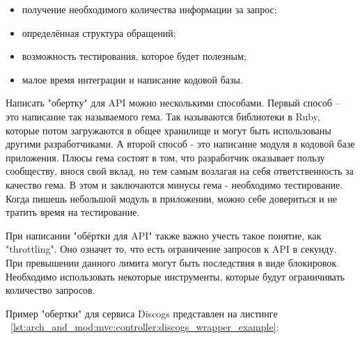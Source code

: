 \begin{itemize}
  \item получение необходимого количества информации за запрос;
  \item определённая структура обращений;
  \item возможность тестирования, которое будет полезным;
  \item малое время интеграции и написание кодовой базы.
\end{itemize}

Написать "обертку" для API можно несколькими способами. Первый способ -- это написание так называемого гема. Так называются библиотеки в Ruby, которые потом загружаются в общее хранилище и могут быть использованы другими разработчиками. А второй способ - это написание модуля в кодовой базе приложения. Плюсы гема состоят в том, что разработчик оказывает пользу сообществу, внося свой вклад, но тем самым возлагая на себя ответственность за качество гема. В этом и заключаются минусы гема - необходимо тестирование. Когда пишешь небольшой модуль в приложении, можно себе довериться и не тратить время на тестирование.

При написании "обёртки для API" также важно учесть такое понятие, как "throttling". Оно означет то, что есть ограничение запросов к API в секунду. При превышении данного лимита могут быть последствия в виде блокировок. Необходимо использовать некоторые инструменты, которые будут ограничивать количество запросов.

Пример "обертки" для сервиса Discogs представлен на листинге ~\ref{lst:arch_and_mod:mvc:controller:discogs_wrapper_example}:


